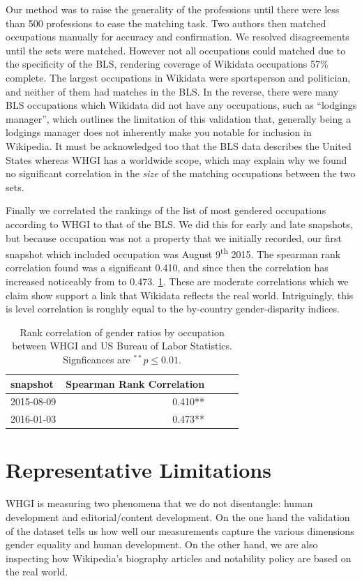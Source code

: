 \documentclass[letterpaper]{article}
\begin{document}
Our method was to raise the generality of the professions until there were less than 500 professions to ease the matching task. Two authors then matched occupations manually for accuracy and confirmation. We resolved disagreements until the sets were matched. However not all occupations could matched due to the specificity of the BLS, rendering coverage of Wikidata occupations 57\% complete. The largest occupations in Wikidata were sportsperson and politician, and neither of them had matches in the BLS. In the reverse, there were many BLS occupations which Wikidata did not have any occupations, such as ``lodgings manager'', which outlines the limitation of this validation that, generally being a lodgings manager does not inherently make you notable for inclusion in Wikipedia. It must be acknowledged too that the BLS data describes the United States whereas WHGI has a worldwide scope, which may explain why we found no significant correlation in the \textit{size} of the matching occupations between the two sets.

Finally we correlated the rankings of the list of most gendered occupations according to WHGI to that of the BLS. We did this for early and late snapshots, but because occupation was not a property that we initially recorded, our first snapshot which included occupation was August 9\textsuperscript{th} 2015. The spearman rank correlation found was a significant 0.410,  and since then the correlation has increased noticeably from to 0.473. \ref{table:bls}. These are moderate correlations which we claim show support a link that Wikidata reflects the real world. Intriguingly, this is level correlation is roughly equal to the by-country gender-disparity indices.

\begin{table}
\caption{Rank correlation of gender ratios by occupation between WHGI and US
Bureau of Labor Statistics. Signficances are $ ^{**}p\leq 0.01$.}
\label{table:bls}
\begin{tabular}{lrrrr}
\toprule
snapshot &  Spearman Rank Correlation \\
\midrule
2015-08-09 & 0.410**  \\
2016-01-03 & 0.473**  \\
\bottomrule
\end{tabular}
\end{table}

\section{Representative Limitations}
WHGI is measuring two phenomena that we do not disentangle: human development and editorial/content development. On the one hand the validation of the dataset tells us how well our measurements capture the various dimensions gender equality and human development. On the other hand, we are also inspecting how Wikipedia's biography articles and notability policy are based on the real world.
\end{document}
